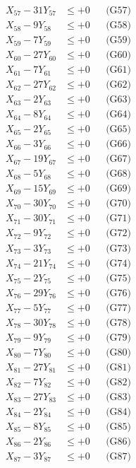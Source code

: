 \documentclass[a4paper,10pt]{article}
\begin{document}
{\begin{align}
X_{57} - 31Y_{57} &\leq +0 && \text{(G57)} \\
\allowbreak
X_{58} - 9Y_{58} &\leq +0 && \text{(G58)} \\
X_{59} - 7Y_{59} &\leq +0 && \text{(G59)} \\
X_{60} - 27Y_{60} &\leq +0 && \text{(G60)} \\
X_{61} - 7Y_{61} &\leq +0 && \text{(G61)} \\
X_{62} - 27Y_{62} &\leq +0 && \text{(G62)} \\
X_{63} - 2Y_{63} &\leq +0 && \text{(G63)} \\
X_{64} - 8Y_{64} &\leq +0 && \text{(G64)} \\
X_{65} - 2Y_{65} &\leq +0 && \text{(G65)} \\
X_{66} - 3Y_{66} &\leq +0 && \text{(G66)} \\
X_{67} - 19Y_{67} &\leq +0 && \text{(G67)} \\
\allowbreak
X_{68} - 5Y_{68} &\leq +0 && \text{(G68)} \\
X_{69} - 15Y_{69} &\leq +0 && \text{(G69)} \\
X_{70} - 30Y_{70} &\leq +0 && \text{(G70)} \\
X_{71} - 30Y_{71} &\leq +0 && \text{(G71)} \\
X_{72} - 9Y_{72} &\leq +0 && \text{(G72)} \\
X_{73} - 3Y_{73} &\leq +0 && \text{(G73)} \\
X_{74} - 21Y_{74} &\leq +0 && \text{(G74)} \\
X_{75} - 2Y_{75} &\leq +0 && \text{(G75)} \\
X_{76} - 29Y_{76} &\leq +0 && \text{(G76)} \\
X_{77} - 5Y_{77} &\leq +0 && \text{(G77)} \\
\allowbreak
X_{78} - 30Y_{78} &\leq +0 && \text{(G78)} \\
X_{79} - 9Y_{79} &\leq +0 && \text{(G79)} \\
X_{80} - 7Y_{80} &\leq +0 && \text{(G80)} \\
X_{81} - 27Y_{81} &\leq +0 && \text{(G81)} \\
X_{82} - 7Y_{82} &\leq +0 && \text{(G82)} \\
X_{83} - 27Y_{83} &\leq +0 && \text{(G83)} \\
X_{84} - 2Y_{84} &\leq +0 && \text{(G84)} \\
X_{85} - 8Y_{85} &\leq +0 && \text{(G85)} \\
X_{86} - 2Y_{86} &\leq +0 && \text{(G86)} \\
X_{87} - 3Y_{87} &\leq +0 && \text{(G87)} \\

\end{align}}
\end{document}
